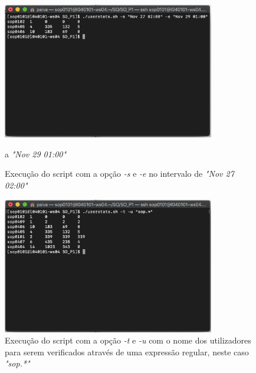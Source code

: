 \documentclass[10pt,portuguese]{article}
\begin{document}
\begin{figure}[!h]
    \centering
    \includegraphics[width=350]{Resultados/-s_-e.png}
    \caption{Execução do script com a opção \textit{-s} e \textit{-e} no intervalo de \textit{"Nov 27 02:00"}} a \textit{"Nov 29 01:00"}
\end{figure}

\begin{figure}[!h]
    \centering
    \includegraphics[width=350]{Resultados/-t_-u.png}
    \caption{Execução do script com a opção \textit{-t} e \textit{-u} com o nome dos utilizadores para serem verificados através de uma expressão regular, neste caso \textit{"sop.*"}}
\end{figure}
\end{document}
